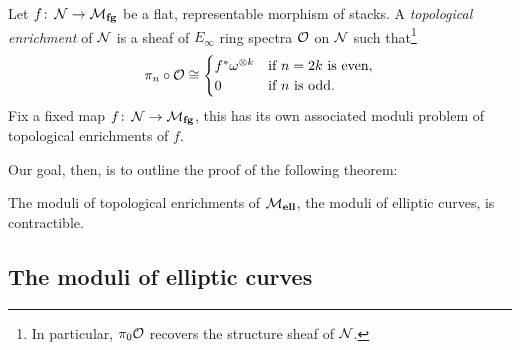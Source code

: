 \begin{definition}
Let $f\colon\thinspace \mathcal{N} \to \mathcal{M}_{\mathbf{fg}}$ be a flat, representable morphism of stacks.  A \textit{topological enrichment} of $\mathcal{N}$ is a sheaf of $E_\infty$ ring spectra $\mathcal{O}$ on $\mathcal{N}$ such that\footnote{In particular, $\pi_0 \mathcal{O}$ recovers the structure sheaf of $\mathcal{N}$.} \[\pi_n \circ \mathcal{O} \cong \begin{cases} f^* \omega^{\otimes k} & \text{if $n = 2k$ is even}, \\ 0 & \text{if $n$ is odd}. \end{cases}\]  Fix a fixed map $f\colon\thinspace \mathcal{N} \to \mathcal{M}_{\mathbf{fg}}$, this has its own associated moduli problem of topological enrichments of $f$.
\end{definition}

Our goal, then, is to outline the proof of the following theorem:

\begin{theorem}\label{UniqueTopEnrichmentOfMell}
The moduli of topological enrichments of $\mathcal{M}_{\mathbf{ell}}$, the moduli of elliptic curves, is contractible.
\end{theorem}



\subsection*{The moduli of elliptic curves}

